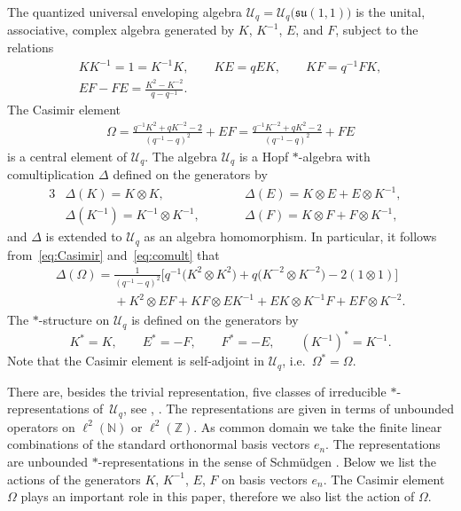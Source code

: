 \documentclass[11pt]{article}
\numberwithin{equation}{section}
\numberwithin{theorem}{section}
\numberwithin{proposition}{section}
\numberwithin{lemma}{section}
\numberwithin{corollary}{section}
\numberwithin{definition}{section}
\numberwithin{example}{section}
\numberwithin{remark}{section}
\numberwithin{note}{section}
\newcommand{\N}{\mathbb N}
\newcommand{\Z}{\mathbb Z}
\newcommand{\su}{\mathfrak{su}}
\newcommand{\U}{\mathcal U}
\begin{document}
The quantized universal enveloping algebra $\mathcal U_q = \U_q\big(\su(1,1)\big)$ is the unital, associative, complex algebra generated by $K$, $K^{-1}$, $E$, and $F$, subject to the relations
\begin{gather}
K K^{-1} = 1 = K^{-1}K, \qquad KE = qEK, \qquad KF= q^{-1}FK, \nonumber\\
 EF-FE =\frac{K^2-K^{-2}}{q-q^{-1}}.\label{eq:commutationrel}
\end{gather}
The Casimir element
\begin{gather} \label{eq:Casimir}
\Omega = \frac{q^{-1} K^2 +qK^{-2}-2}{(q^{-1}-q)^2} + EF= \frac{q^{-1}K^{-2}+qK^2-2}{(q^{-1}-q)^2} +FE
\end{gather}
is a central element of $\U_q$. The algebra
$\U_q$ is a Hopf $*$-algebra with comultiplication $\Delta$ def\/ined on the generators by
\begin{alignat}{3}
& \Delta(K) = K \otimes K,\qquad && \Delta(E)= K \otimes E + E \otimes K^{-1},& \nonumber\\
& \Delta(K^{-1}) = K^{-1} \otimes K^{-1},\qquad && \Delta(F) = K \otimes F + F \otimes K^{-1} ,& \label{eq:comult}
\end{alignat}
and $\Delta$ is extended to $\mathcal U_q$ as an algebra homomorphism. In particular, it follows from~\eqref{eq:Casimir} and~\eqref{eq:comult} that
\begin{gather}
\Delta(\Omega) = \frac{1}{(q^{-1}-q)^{2}} \big[ q^{-1}\big( K^2 \otimes K^2 \big)+ q
\big(K^{-2} \otimes K^{-2}\big) -2 (1\otimes 1) \big] \nonumber\\
\phantom{\Delta(\Omega) =}{} + K^2 \otimes EF +KF\otimes
EK^{-1} + EK \otimes K^{-1}F + EF \otimes K^{-2}.\label{eq:De(OM)}
\end{gather}
The $*$-structure on $\U_q$ is def\/ined on the generators by
\[
K^*=K, \qquad E^*=-F, \qquad F^* = -E, \qquad (K^{-1})^* = K^{-1}.
\]
Note that the Casimir element is self-adjoint in $\U_q$, i.e.~$\Omega^*=\Omega$.

There are, besides the trivial representation, f\/ive classes of irreducible $*$-representations of~$\U_q$, see \cite[Proposition~4]{MMNNSU}, \cite[Section~6]{BK93}. The representations are given in terms of unbounded operators on $\ell^2(\N)$ or $\ell^2(\Z)$. As common domain we take the f\/inite linear combinations of the standard orthonormal basis vectors $e_n$. The representations are unbounded $*$-representations in the sense of Schm\"udgen \cite[Def\/inition~8.1.9]{Sch}. Below we list the actions of the generators $K$, $K^{-1}$, $E$, $F$ on basis vectors $e_n$. The Casimir element~$\Omega$ plays an important role in this paper, therefore we also list the action of $\Omega$.
\end{document}
